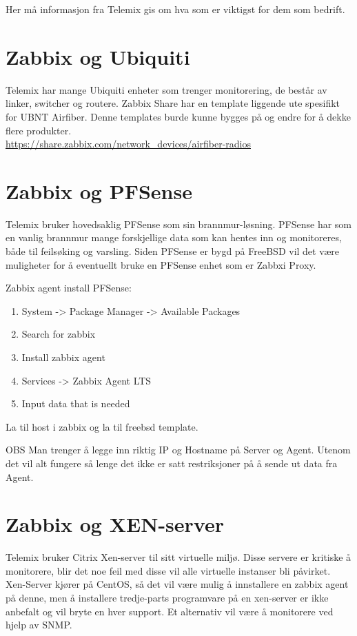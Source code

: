 Her må informasjon fra Telemix gis om hva som er viktigst for dem som bedrift. 

\section{Zabbix og Ubiquiti}
Telemix har mange Ubiquiti enheter som trenger monitorering, de består av linker, switcher og routere. 
Zabbix Share har en template liggende ute spesifikt for UBNT Airfiber. Denne templates burde kunne bygges på og endre for å dekke flere produkter.
\\\url{https://share.zabbix.com/network_devices/airfiber-radios}


\section{Zabbix og PFSense}
Telemix bruker hovedsaklig PFSense som sin brannmur-løsning. PFSense har som en vanlig brannmur mange forskjellige data som kan hentes inn og monitoreres, både til feilsøking og varsling.
Siden PFSense er bygd på FreeBSD vil det være muligheter for å eventuellt bruke en PFSense enhet som er Zabbxi Proxy.

Zabbix agent install PFSense:
\begin{enumerate}
    \item System -> Package Manager -> Available Packages
    \item Search for zabbix
    \item Install zabbix agent
    \item Services -> Zabbix Agent LTS
    \item Input data that is needed
\end{enumerate}


La til host i zabbix og la til freebsd template. 

\begin{tanke}{OBS}
    Man trenger å legge inn riktig IP og Hostname på Server og Agent. Utenom det vil alt fungere så lenge det ikke er satt restriksjoner på å sende ut data fra Agent.
\end{tanke}


\section{Zabbix og XEN-server}
Telemix bruker Citrix Xen-server til sitt virtuelle miljø. Disse servere er kritiske å monitorere, blir det noe feil med disse vil alle virtuelle instanser bli påvirket.
Xen-Server kjører på CentOS, så det vil være mulig å innstallere en zabbix agent på denne, men å installere tredje-parts programvare på en xen-server er ikke anbefalt og vil bryte en hver support.
Et alternativ vil være å monitorere ved hjelp av SNMP.



